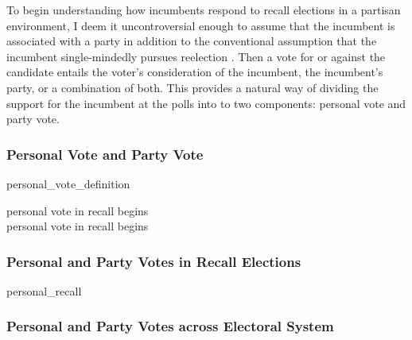 \documentclass[hyphens, crop=false]{standalone}
\begin{document}
		To begin understanding how incumbents respond to recall elections
		in a partisan environment,
		I deem it uncontroversial enough to assume that
		the incumbent
		is associated with a party
		in addition to the conventional assumption that the incumbent
		single-mindedly pursues reelection
		\autocite{mayhewCongressElectoralConnection1974}.
		Then a vote for or against the candidate
		entails the voter's consideration of
		the incumbent,
		the incumbent's party,
		or a combination of both.
		This provides a natural way of dividing the support for the incumbent at the polls
		into to two components:
		personal vote and party vote.
		\subsubsection*{Personal Vote and Party Vote}
		{personal_vote_definition}
		
		
		
		
			
			
			personal vote in recall begins
			\\
			personal vote in recall begins
			
		
		\subsubsection*{Personal and Party Votes in Recall Elections}
		
			{personal_recall}
			

		
		\subsubsection*{Personal and Party Votes across Electoral System}
			
\end{document}
